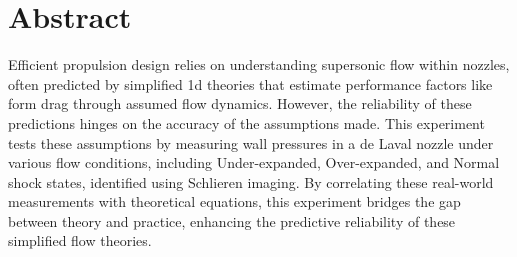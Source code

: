 \thispagestyle{plain} %



\chapter*{Abstract} %

Efficient propulsion design relies on understanding supersonic flow within nozzles, often predicted by simplified \acrfull{1d} theories that estimate performance factors like form drag through assumed flow dynamics. However, the reliability of these predictions hinges on the accuracy of the assumptions made. This experiment tests these assumptions by measuring wall pressures in a de Laval nozzle under various flow conditions, including Under-expanded, Over-expanded, and Normal shock states, identified using Schlieren imaging. By correlating these real-world measurements with theoretical equations, this experiment bridges the gap between theory and practice, enhancing the predictive reliability of these simplified flow theories. 



